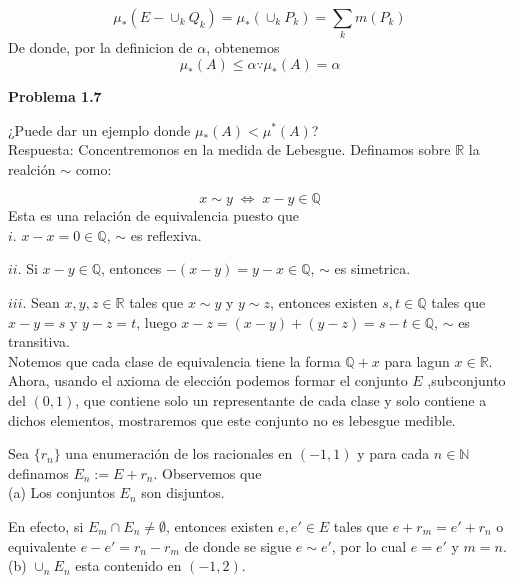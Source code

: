 \documentclass[12pt]{article}
\begin{document}
    \[\mu_* (E-\cup_k Q_k) = \mu_*(\cup_k P_k) = \sum_k m(P_k)\]
    De donde, por la definicion de $\alpha$, obtenemos
    \[\mu_*(A) \leq \alpha \because \mu_*(A) = \alpha\]

    \textbf{Problema 1.7}

    ¿Puede dar un ejemplo donde $\mu_*(A) < \mu^*(A)$?
    \\

    Respuesta: Concentremonos en la medida de Lebesgue. Definamos sobre $\mathbb{R}$ la 
    realci\'on $\sim$ como:

    \[x\sim y\; \Leftrightarrow\; x-y\in \mathbb{Q}\]
    Esta es una relaci\'on de equivalencia puesto que 
    \\

    $i$. \hspace*{5pt} $x-x = 0\in \mathbb{Q}$, $\sim$ es reflexiva.

    $ii$. \hspace*{1pt} Si $x-y\in \mathbb{Q}$, entonces $-(x-y) = y-x\in \mathbb{Q}$, $\sim$ es simetrica.

    $iii.$ Sean $x,y,z\in \mathbb{R}$ tales que $x\sim y$ y $y\sim z$, entonces existen 
    $s,t\in \mathbb{Q}$ tales que $x-y = s$ \hspace*{33pt} y $y-z = t$, luego 
    $x-z = (x-y)+(y-z) = s-t\in \mathbb{Q}$, $\sim$ es transitiva.
    \\

    Notemos que cada clase de equivalencia tiene la forma $\mathbb{Q}+x$ para lagun 
    $x\in \mathbb{R}$. Ahora, usando el axioma de elecci\'on podemos formar el conjunto $E$
    ,subconjunto del $(0,1)$, que contiene solo un representante de cada clase y solo 
    contiene a dichos elementos, mostraremos que este conjunto no es lebesgue medible.

    Sea $\{r_n\}$ una enumeraci\'on de los racionales en $(-1,1)$ y para cada $n\in \mathbb{N}$
    definamos $E_n := E+r_n$. Observemos que 
    \\

    (a) Los conjuntos $E_n$ son disjuntos.

    \hspace*{14pt} En efecto, si $E_m\cap E_n \neq \emptyset$, entonces existen $e,e'\in E$ tales que 
    $e+r_m = e'+r_n$ o \hspace*{32pt} equivalente $e-e' = r_n-r_m$ de donde se sigue $e\sim e'$, por lo cual
    $e = e'$ y $m=n$. \\

    (b) $\cup_n E_n$ esta contenido en $(-1,2)$. 
\end{document}
